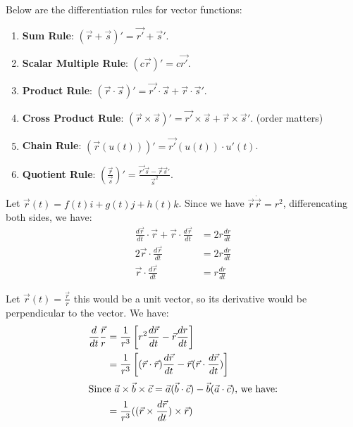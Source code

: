 \documentclass[11pt]{report}
\begin{document}
\begin{theorem}
    Below are the differentiation rules for vector functions:
    \begin{enumerate}
        \item \textbf{Sum Rule}: $(\vec{r} + \vec{s})' = \vec{r'} + \vec{s}'$.
        \item \textbf{Scalar Multiple Rule}: $(c\vec{r})' = c\vec{r'}$.
        \item \textbf{Product Rule}: $(\vec{r} \cdot \vec{s})' = \vec{r'} \cdot \vec{s} + \vec{r} \cdot \vec{s}'$.
        \item \textbf{Cross Product Rule}: $(\vec{r} \times \vec{s})' = \vec{r'} \times \vec{s} + \vec{r} \times \vec{s}'$. (order matters)
        \item \textbf{Chain Rule}: $(\vec{r}(u(t)))' = \vec{r'}(u(t)) \cdot u'(t)$.
        \item \textbf{Quotient Rule}: $\left( \frac{\vec{r}}{\vec{s}} \right)' = \frac{\vec{r'} \vec{s} - \vec{r} \vec{s}'}{\vec{s}^2}$.
    \end{enumerate}
\end{theorem}
\begin{example}
    Let $\vec{r}(t) = f(t)i + g(t)j + h(t)k$. Since we have $\vec{r} \dot \vec{r} = r^2$, differencating both sides, we have:
    \begin{align*}
        \frac{d\vec{r}}{dt} \cdot \vec{r} + \vec{r} \cdot \frac{d\vec{r}}{dt} &= 2r \frac{dr}{dt} \\
        2\vec{r} \cdot \frac{d\vec{r}}{dt} &= 2r \frac{dr}{dt} \\
        \vec{r} \cdot \frac{d\vec{r}}{dt} &= r \frac{dr}{dt}
    \end{align*}
\end{example}
\begin{example}
    Let $\vec{r}(t) = \frac{\vec{r}}{r}$ this would be a unit vector, so its derivative would be perpendicular to the vector. We have:
    \begin{align*}
       \frac{d}{dt}\frac{\vec{r}}{r} &= \frac{1}{r^3}\left[ r^2\frac{d\vec{r}}{dt} - \vec{r}\frac{dr}{dt} \right] \\
         &= \frac{1}{r^3}\left[ (\vec{r} \cdot \vec{r})\frac{d\vec{r}}{dt} - \vec{r}(\vec{r} \cdot \frac{d\vec{r}}{dt}) \right] \\
         \intertext{Since $\vec{a} \times \vec{b} \times \vec{c} = \vec{a}(\vec{b} \cdot \vec{c}) - \vec{b}(\vec{a} \cdot \vec{c})$, we have:}
         &= \frac{1}{r^3}((\vec{r} \times \frac{d\vec{r}}{dt}) \times \vec{r}) 
    \end{align*}
\end{example}
\end{document}
